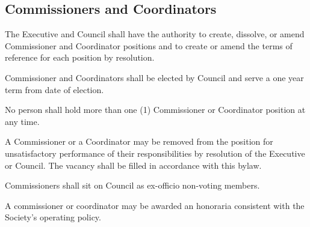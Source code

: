 \subsection {Commissioners and Coordinators} 
\begin{longenum}[ label*=\thesubsection.\arabic*., align=left]
	\item The Executive and Council shall have the authority to create, dissolve, or amend Commissioner and Coordinator positions and to create or amend the terms of reference for each position by resolution. 
    \item Commissioner and Coordinators shall be elected by Council and serve a one year term from date of election. 
    \item No person shall hold more than one (1) Commissioner or Coordinator position at any time.
    \item A Commissioner or a Coordinator may be removed from the position for unsatisfactory performance of their responsibilities by resolution of the Executive or Council. The vacancy shall be filled in accordance with this bylaw.  
    \item Commissioners shall sit on Council as ex-officio non-voting members.
    
    \item A commissioner or coordinator may be awarded an honoraria consistent with the Society's operating policy.
\end{longenum}

